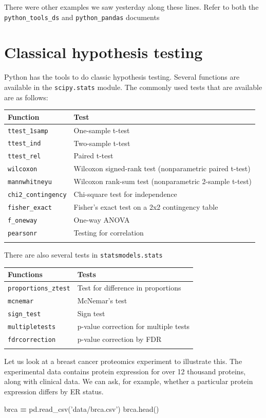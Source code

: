\documentclass[
  letterpaper,
]{scrbook}
\newenvironment{Shaded}{\begin{snugshade}}{\end{snugshade}}
\newcommand{\NormalTok}[1]{#1}
\newcommand{\OperatorTok}[1]{\textcolor[rgb]{0.81,0.36,0.00}{\textbf{#1}}}
\newcommand{\StringTok}[1]{\textcolor[rgb]{0.31,0.60,0.02}{#1}}
\begin{document}
There were other examples we saw yesterday along these lines. Refer to both the \texttt{python\_tools\_ds} and \texttt{python\_pandas} documents

\hypertarget{classical-hypothesis-testing}{%
\section{Classical hypothesis testing}\label{classical-hypothesis-testing}}

Python has the tools to do classic hypothesis testing. Several functions are available in the \texttt{scipy.stats} module. The commonly used tests that are available are as follows:

\begin{longtable}[]{@{}ll@{}}
\toprule
Function & Test\tabularnewline
\midrule
\endhead
\texttt{ttest\_1samp} & One-sample t-test\tabularnewline
\texttt{ttest\_ind} & Two-sample t-test\tabularnewline
\texttt{ttest\_rel} & Paired t-test\tabularnewline
\texttt{wilcoxon} & Wilcoxon signed-rank test (nonparametric paired t-test)\tabularnewline
\texttt{mannwhitneyu} & Wilcoxon rank-sum test (nonparametric 2-sample t-test)\tabularnewline
\texttt{chi2\_contingency} & Chi-square test for independence\tabularnewline
\texttt{fisher\_exact} & Fisher's exact test on a 2x2 contingency table\tabularnewline
\texttt{f\_oneway} & One-way ANOVA\tabularnewline
\texttt{pearsonr} & Testing for correlation\tabularnewline
&\tabularnewline
\bottomrule
\end{longtable}

There are also several tests in \texttt{statsmodels.stats}

\begin{longtable}[]{@{}ll@{}}
\toprule
Functions & Tests\tabularnewline
\midrule
\endhead
\texttt{proportions\_ztest} & Test for difference in proportions\tabularnewline
\texttt{mcnemar} & McNemar's test\tabularnewline
\texttt{sign\_test} & Sign test\tabularnewline
\texttt{multipletests} & p-value correction for multiple tests\tabularnewline
\texttt{fdrcorrection} & p-value correction by FDR\tabularnewline
&\tabularnewline
\bottomrule
\end{longtable}

Let us look at a breast cancer proteomics experiment to illustrate this. The experimental data contains protein expression for over 12 thousand proteins, along with clinical data. We can ask, for example, whether a particular protein expression differs by ER status.

\begin{Shaded}
\begin{Highlighting}[]
\NormalTok{brca }\OperatorTok{=}\NormalTok{ pd.read_csv(}\StringTok{'data/brca.csv'}\NormalTok{)}
\NormalTok{brca.head()}
\end{Highlighting}
\end{Shaded}
\end{document}

